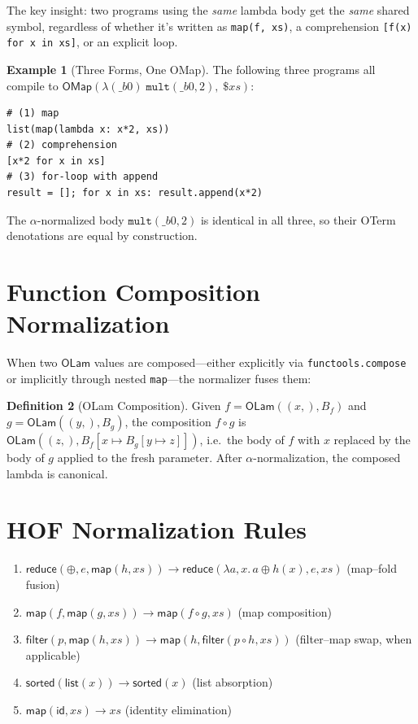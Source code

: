 \documentclass[11pt,a4paper]{report}
\theoremstyle{definition}
\newtheorem{definition}{Definition}[chapter]
\newtheorem{example}[definition]{Example}
\theoremstyle{plain}
\begin{document}
The key insight: two programs using the \emph{same} lambda body get
the \emph{same} shared symbol, regardless of whether it's written as
\texttt{map(f, xs)}, a comprehension \texttt{[f(x) for x in xs]}, or
an explicit loop.

\begin{example}[Three Forms, One OMap]
The following three programs all compile to
$\mathsf{OMap}(\lambda(\_b0)\;\texttt{mult}(\_b0, 2),\; \$\mathit{xs})$:
\begin{lstlisting}
# (1) map
list(map(lambda x: x*2, xs))
# (2) comprehension
[x*2 for x in xs]
# (3) for-loop with append
result = []; for x in xs: result.append(x*2)
\end{lstlisting}
The $\alpha$-normalized body $\texttt{mult}(\_b0, 2)$ is identical in
all three, so their OTerm denotations are equal by construction.
\end{example}

\section{Function Composition Normalization}

When two $\mathsf{OLam}$ values are composed---either explicitly via
\texttt{functools.compose} or implicitly through nested
\texttt{map}---the normalizer fuses them:

\begin{definition}[OLam Composition]
Given $f = \mathsf{OLam}((x,), B_f)$ and $g = \mathsf{OLam}((y,), B_g)$,
the composition $f \circ g$ is
$\mathsf{OLam}((z,), B_f[x \mapsto B_g[y \mapsto z]])$,
i.e.\ the body of $f$ with $x$ replaced by the body of $g$ applied to
the fresh parameter.  After $\alpha$-normalization, the composed lambda
is canonical.
\end{definition}

\section{HOF Normalization Rules}

\begin{enumerate}
  \item $\mathsf{reduce}(\oplus, e, \mathsf{map}(h, xs)) \to
    \mathsf{reduce}(\lambda a,x.\, a \oplus h(x), e, xs)$
    \hfill (map--fold fusion)
  \item $\mathsf{map}(f, \mathsf{map}(g, xs)) \to
    \mathsf{map}(f \circ g, xs)$
    \hfill (map composition)
  \item $\mathsf{filter}(p, \mathsf{map}(h, xs)) \to
    \mathsf{map}(h, \mathsf{filter}(p \circ h, xs))$
    \hfill (filter--map swap, when applicable)
  \item $\mathsf{sorted}(\mathsf{list}(x)) \to \mathsf{sorted}(x)$
    \hfill (list absorption)
  \item $\mathsf{map}(\mathsf{id}, xs) \to xs$
    \hfill (identity elimination)
\end{enumerate}
\end{document}
